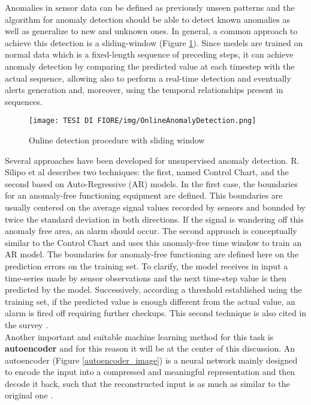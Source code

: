Anomalies in sensor data can be defined as previously unseen patterns and the algorithm for anomaly detection should be able to detect known anomalies as well as generalize to new and unknown ones. In general, a common approach to achieve this detection is a sliding-window (Figure \ref{anomaly_detection_with_sliding_window}). Since medels are trained on normal data which is a fixed-length sequence of preceding steps, it can achieve anomaly detection by comparing the predicted value at each timestep with the actual sequence, allowing also to perform a real-time detection and eventually alerts generation \cite{9UnsupervisedOnlineAnomalyDetectionMultivariate} and, moreover, using the temporal relationships present in sequences.
\begin{figure}[ht]
\texttt{[image: TESI DI FIORE/img/OnlineAnomalyDetection.png]}
\centering
\caption{Online detection procedure with sliding window \cite{9UnsupervisedOnlineAnomalyDetectionMultivariate}}
\label{anomaly_detection_with_sliding_window}
\end{figure}
Several approaches have been developed for unsupervised anomaly detection. R. Silipo et al \cite{8AnomalyDetectionUnsupervised2} describes two techniques: the first, named Control Chart, and the second based on Auto-Regressive (AR) models. In the first case, the boundaries for an anomaly-free functioning equipment are defined. This boundaries are usually centered on the average signal values recorded by sensors and bounded by twice the standard deviation in both directions. If the signal is wandering off this anomaly free area, an alarm should occur. The second approach is conceptually similar to the Control Chart and uses this anomaly-free time window to train an AR model. The boundaries for anomaly-free functioning are defined here on the prediction errors on the training set. To clarify, the model receives in input a time-series made by sensor observations and the next time-step value is then predicted by the model. Successively, according a threshold established using the training set, if the predicted value is enough different from the actual value, an alarm is fired off requiring further checkups. This second technique is also cited in the survey \cite{6AnomalyIoTTimeSeries}.\\
Another important and suitable machine learning method for this task is \textbf{autoencoder} and for this reason it will be at the center of this discussion. 
An autoencoder (Figure \ref{autoencoder_image}) is a neural network mainly designed to encode the input into a compressed and meaningful representation and then decode it back, such that the reconstructed input is as much as similar to the original one \cite{10Autoencoders}.\\
